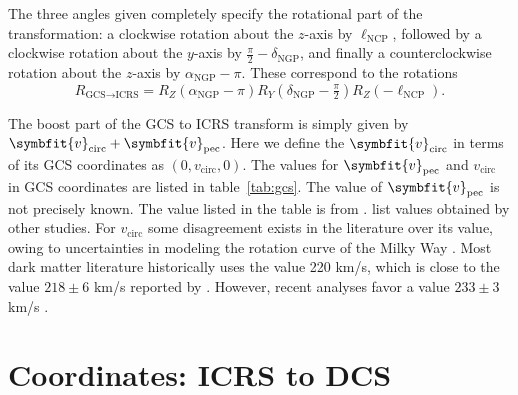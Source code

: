 \documentclass[b5paper, 10pt, twoside]{book}
\renewcommand{\vec}[1]{\symbfit{#1}}
\begin{document}
The three angles given completely specify the rotational part of the transformation: a clockwise rotation about the $z$-axis by $\ell_\text{NCP}$, followed by a clockwise rotation about the $y$-axis by $\tfrac{\pi}{2}-\delta_\text{NGP}$, and finally a counterclockwise rotation about the $z$-axis by $\alpha_\text{NGP}-\pi$. These correspond to the rotations
\begin{equation}
    R_{\text{GCS}\rightarrow\text{ICRS}}=R_Z(\alpha_\text{NGP}-\pi)R_Y(\delta_\text{NGP}-\tfrac{\pi}{2})R_Z(-\ell_\text{NCP}).
\end{equation}

The boost part of the GCS to ICRS transform is simply given by $\vec{v}_\text{circ}+\vec{v}_\text{pec}$. Here we define the $\vec{v}_\text{circ}$ in terms of its GCS coordinates as $(0,v_\text{circ},0)$. The values for $\vec{v}_\text{pec}$ and $v_\text{circ}$ in GCS coordinates are listed in table~\ref{tab:gcs}. The value of $\vec{v}_\text{pec}$ is not precisely known. The value listed in the table is from \textcite{SchonrichBinneyDehnen2010}. \textcite{Coskunoglu2011} list values obtained by other studies. For $v_\text{circ}$ some disagreement exists in the literature over its value, owing to uncertainties in modeling the rotation curve of the Milky Way \parencite{McMillanBinney2009}. Most dark matter literature historically uses the value 220 km/s, which is close to the value $218\pm6$ km/s reported by \textcite{Bovy2012}. However, recent analyses favor a value $233\pm3$ km/s \parencites{McMillan2017, EvansOHareMcCabe2019}.

\section{Coordinates: ICRS to DCS}
\end{document}
